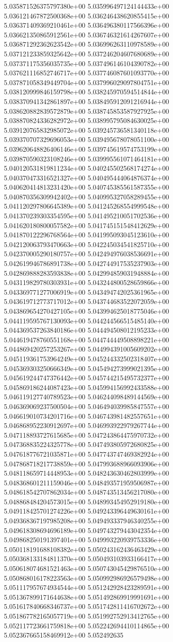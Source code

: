 5.035871526375797380e+00	5.035996497124144433e+00	5.036121467872500368e+00	5.036246438620855415e+00	5.036371409369210461e+00	5.036496380117566396e+00	5.036621350865912561e+00	5.036746321614267607e+00	5.036871292362623542e+00	5.036996263110978589e+00	5.037121233859325642e+00	5.037246204607680689e+00	5.037371175356035735e+00	5.037496146104390782e+00	5.037621116852746717e+00	5.037746087601093770e+00	5.037871058349449704e+00	5.037996029097804751e+00	5.038120999846159798e+00	5.038245970594514844e+00	5.038370941342861897e+00	5.038495912091216944e+00	5.038620882839572879e+00	5.038745853587927925e+00	5.038870824336282972e+00	5.038995795084630025e+00	5.039120765832985072e+00	5.039245736581340118e+00	5.039370707329696053e+00	5.039495678078051100e+00	5.039620648826406146e+00	5.039745619574753199e+00	5.039870590323108246e+00	5.039995561071464181e+00	5.040120531819811234e+00	5.040245502568174274e+00	5.040370473316521327e+00	5.040495444064876374e+00	5.040620414813231420e+00	5.040745385561587355e+00	5.040870356309942402e+00	5.040995327058289455e+00	5.041120297806645389e+00	5.041245268554999548e+00	5.041370239303354595e+00	5.041495210051702536e+00	5.041620180800057582e+00	5.041745151548412629e+00	5.041870122296768564e+00	5.041995093045123610e+00	5.042120063793470663e+00	5.042245034541825710e+00	5.042370005290180757e+00	5.042494976038536691e+00	5.042619946786891738e+00	5.042744917535237903e+00	5.042869888283593838e+00	5.042994859031948884e+00	5.043119829780303931e+00	5.043244800528659866e+00	5.043369771277006919e+00	5.043494742025361965e+00	5.043619712773717012e+00	5.043744683522072059e+00	5.043869654270427105e+00	5.043994625018775046e+00	5.044119595767130093e+00	5.044244566515485140e+00	5.044369537263840186e+00	5.044494508012195233e+00	5.044619478760551168e+00	5.044744449508898221e+00	5.044869420257253267e+00	5.044994391005609202e+00	5.045119361753964249e+00	5.045244332502318407e+00	5.045369303250666349e+00	5.045494273999021395e+00	5.045619244747376442e+00	5.045744215495732377e+00	5.045869186244087423e+00	5.045994156992433588e+00	5.046119127740789523e+00	5.046244098489144569e+00	5.046369069237500504e+00	5.046494039985847557e+00	5.046619010734201716e+00	5.046743981482557651e+00	5.046868952230912697e+00	5.046993922979267744e+00	5.047118893727615685e+00	5.047243864475970732e+00	5.047368835224325778e+00	5.047493805972680825e+00	5.047618776721035871e+00	5.047743747469382924e+00	5.047868718217738859e+00	5.047993688966093906e+00	5.048118659714448953e+00	5.048243630462803999e+00	5.048368601211159046e+00	5.048493571959506987e+00	5.048618542707862034e+00	5.048743513456217080e+00	5.048868484204573015e+00	5.048993454952919180e+00	5.049118425701274226e+00	5.049243396449630161e+00	5.049368367197985208e+00	5.049493337946340255e+00	5.049618308694696189e+00	5.049743279443042354e+00	5.049868250191397401e+00	5.049993220939753336e+00	5.050118191688108382e+00	5.050243162436463429e+00	5.050368133184811370e+00	5.050493103933166417e+00	5.050618074681521463e+00	5.050743045429876510e+00	5.050868016178223563e+00	5.050992986926579498e+00	5.051117957674934544e+00	5.051242928423289591e+00	5.051367899171644638e+00	5.051492869919991691e+00	5.051617840668346737e+00	5.051742811416702672e+00	5.051867782165057719e+00	5.051992752913412765e+00	5.052117723661759818e+00	5.052242694410114865e+00	5.052367665158469912e+00	5.052492635